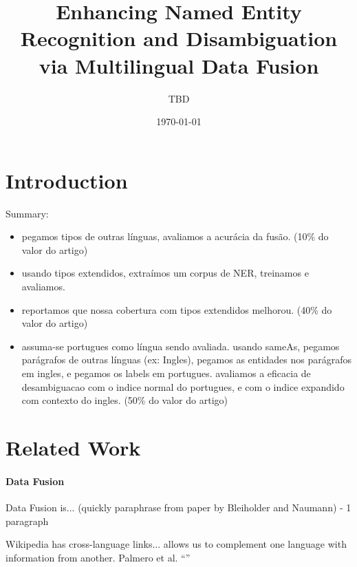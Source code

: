 \documentclass[10pt,a4paper]{article}
\title{Enhancing Named Entity Recognition and Disambiguation via Multilingual Data Fusion}
\author{TBD}
\date{\today}
\newcommand{\copypaste}[1]{``{\color{gray}{#1}}''}
\begin{document}
\maketitle

\begin{abstract}
\end{abstract}

\section{Introduction}


Summary:
\begin{itemize}
\item pegamos tipos de outras línguas, avaliamos a acurácia da fusão. (10\% do valor do artigo)
\item usando tipos extendidos, extraímos um corpus de NER, treinamos e avaliamos.
\item reportamos que nossa cobertura com tipos extendidos melhorou.  (40\% do valor do artigo)
\item assuma-se portugues como língua sendo avaliada. usando sameAs, pegamos parágrafos de outras línguas (ex: Ingles), pegamos as entidades nos parágrafos em ingles, e pegamos os labels em portugues. 
avaliamos a eficacia de desambiguacao com o indice normal do portugues, e com o indice expandido com contexto do ingles. (50\% do valor do artigo)
\end{itemize}


\section{Related Work}

\paragraph{Data Fusion}
Data Fusion is... (quickly paraphrase from paper by Bleiholder and Naumann) - 1 paragraph

Wikipedia has cross-language links... allows us to complement one language with information from another.
Palmero et al. \copypaste{present a resource obtained by automatically mapping templates in 25 languages.} \cite{iknow13palmero}
\end{document}
